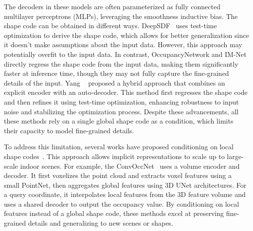 The decoders in these models are often parameterized as fully connected multilayer perceptrons (MLPs), leveraging the smoothness inductive bias. The shape code can be obtained in different ways. DeepSDF~\cite{park2019deepsdf} uses test-time optimization to derive the shape code, which allows for better generalization since it doesn't make assumptions about the input data. However, this approach may potentially overfit to the input data. In contrast, OccupancyNetwork and IM-Net directly regress the shape code from the input data, making them significantly faster at inference time, though they may not fully capture the fine-grained details of the input. Yang \etal~\cite{yang2023reconstructing} proposed a hybrid approach that combines an explicit encoder with an auto-decoder. This method first regresses the shape code and then refines it using test-time optimization, enhancing robustness to input noise and stabilizing the optimization process. Despite these advancements, all these methods rely on a single global shape code as a condition, which limits their capacity to model fine-grained details.

To address this limitation, several works have proposed conditioning on local shape codes~\cite{peng2020convolutional, jiang2020local, genova2020local, chabra2020deep}. This approach allows implicit representations to scale up to large-scale indoor scenes. For example, the ConvOccNet~\cite{peng2020convolutional} uses a volume encoder and decoder. It first voxelizes the point cloud and extracts voxel features using a small PointNet, then aggregates global features using 3D UNet architectures. For a query coordinate, it interpolates local features from the 3D feature volume and uses a shared decoder to output the occupancy value. By conditioning on local features instead of a global shape code, these methods excel at preserving fine-grained details and generalizing to new scenes or shapes.


